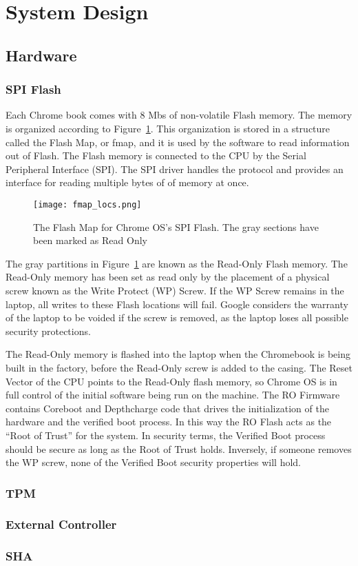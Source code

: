 \section{System Design}

\subsection{Hardware}

\subsubsection{SPI Flash}

Each Chrome book comes with 8 Mbs of non-volatile Flash memory.
The memory is organized according to Figure~\ref{fig:fmap}. 
This organization is stored in a structure called the Flash Map, or fmap, and it is used by the software to read information out of Flash.
The Flash memory is connected to the CPU by the Serial Peripheral Interface (SPI).
The SPI driver handles the protocol and provides an interface for reading multiple bytes of of memory at once.

\begin{figure}
  \centering
  \texttt{[image: fmap\_locs.png]}
  \caption{The Flash Map for Chrome OS's SPI Flash. The gray sections have been marked as Read Only}
  \label{fig:fmap}
\end{figure}

The gray partitions in Figure~\ref{fig:fmap} are known as the Read-Only Flash memory.
The Read-Only memory has been set as read only by the placement of a physical screw known as the Write Protect (WP) Screw.
If the WP Screw remains in the laptop, all writes to these Flash locations will fail.
Google considers the warranty of the laptop to be voided if the screw is removed, as the laptop loses all possible security protections. 

The Read-Only memory is flashed into the laptop when the Chromebook is being built in the factory, before the Read-Only screw is added to the casing. 
The Reset Vector of the CPU points to the Read-Only flash memory, so Chrome OS is in full control of the initial software being run on the machine.
The RO Firmware contains Coreboot and Depthcharge code that drives the initialization of the hardware and the verified boot process. 
In this way the RO Flash acts as the ``Root of Trust'' for the system.
In security terms, the Verified Boot process should be secure as long as the Root of Trust holds.
Inversely, if someone removes the WP screw, none of the Verified Boot security properties will hold.


\subsubsection{TPM}

\subsubsection{External Controller}

\subsubsection{SHA}

